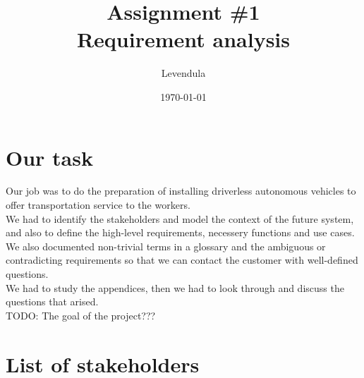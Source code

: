 \documentclass[a4paper]{article}
\title{Assignment \#1 \\ Requirement analysis}
\author{Levendula}
\date{\today}
\begin{document}


\tableofcontents
\clearpage

\section{Our task}

{Our job was to do the preparation of installing driverless autonomous vehicles to offer transportation service to the workers.}\\
{We had to identify the stakeholders and model the context of the future system, and also to define the high-level requirements, necessery functions and use cases. We also documented non-trivial terms in a glossary and the ambiguous or contradicting requirements so that we can contact the customer with well-defined questions.}\\
{We had to study the appendices, then we had to look through and discuss the questions that arised.}\\

{TODO: The goal of the project???}\\



\section{List of stakeholders}
\end{document}
